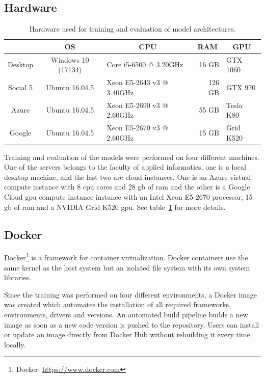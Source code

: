 \subsection{Hardware}
\begin{table}[h]
    \centering
    \begin{tabular}{@{}cclrl@{}}
        \toprule
        \multicolumn{1}{c}{\textbf{}}    & \multicolumn{1}{c}{\textbf{OS}} & \multicolumn{1}{c}{\textbf{CPU}}                    & \multicolumn{1}{c}{\textbf{RAM}} & \multicolumn{1}{c}{\textbf{GPU}}     \\ \midrule
        Desktop      & Windows 10 (17134)        & Core i5-6500 @ 3.20GHz     & 16 GB        & GTX 1060 \\
        Social 5     & Ubuntu 16.04.5            & Xeon E5-2643 v3 @ 3.40GHz  & 126 GB        & GTX 970 \\ 
        Azure        & Ubuntu 16.04.5            & Xeon E5-2690 v3 @ 2.60GHz  & 55 GB        & Tesla K80 \\ 
        Google        & Ubuntu 16.04.5            & Xeon E5-2670 v3 @ 2.60GHz  & 15 GB        & Grid K520 \\
        
        \bottomrule
	\end{tabular}
	\caption{Hardware used for training and evaluation of model architectures.}
    \label{tab:05_usedHardware}
\end{table}
Training and evaluation of the models were performed on four different machines. One of the servers belongs to the faculty of applied informatics, one is a local desktop machine, and the last two are cloud instances. One is an Azure virtual compute instance with 8 \gls{cpu} cores and 28 \gls{gb} of \gls{ram} and the other is a Google Cloud \gls{gpu} compute instance instance with an Intel Xeon E5-2670 processor, 15 \gls{gb} of \gls{ram} and a NVIDIA Grid K520 \gls{gpu}. See table~\ref{tab:05_usedHardware} for more details.



\subsection{Docker}


Docker\footnote{Docker: \url{https://www.docker.com}} is a framework for container virtualization. Docker containers use the same kernel as the host system but an isolated file system with its own system libraries. 
\medskip

Since the training was performed on four different environments, a Docker image was created which automates the installation of all required frameworks, environments, drivers and versions. An automated build pipeline builds a new image as soon as a new code version is pushed to the repository. Users can install or update an image directly from Docker Hub without rebuilding it every time locally.
\medskip

